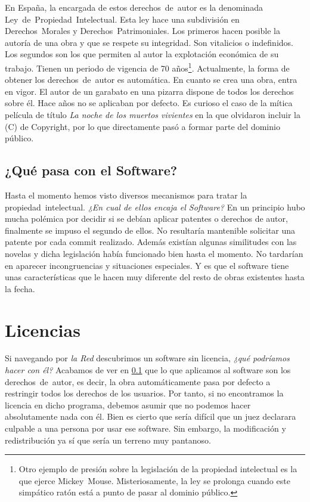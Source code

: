 En España, la encargada de estos derechos~de~autor es la denominada
Ley~de~Propiedad~Intelectual. Esta ley hace una subdivisión en
Derechos~Morales y Derechos~Patrimoniales. Los primeros hacen posible
la autoría de una obra y que se respete su integridad. Son vitalicios
o indefinidos. Los segundos son los que permiten al autor la
explotación económica de su trabajo. Tienen un periodo de vigencia de
70 años\footnote{Otro ejemplo de presión sobre la legislación de la
  propiedad intelectual es la que ejerce
  Mickey~Mouse. Misteriosamente, la ley se prolonga cuando este
  simpático ratón está a punto de pasar al dominio
  público.}. Actualmente, la forma de obtener los derechos~de~autor es
automática. En cuanto se crea una obra, entra en vigor. El autor de un
garabato en una pizarra dispone de todos los derechos sobre él. Hace
años no se aplicaban por defecto. Es curioso el caso de la mítica
película de título \emph{La noche de los muertos vivientes} en la que
olvidaron incluir la (C) de Copyright, por lo que directamente pasó a
formar parte del dominio público.

\subsection{¿Qué pasa con el Software?}
\label{sub:que_pasa}
Hasta el momento hemos visto diversos mecanismos para tratar la
propiedad~intelectual. \emph{¿En cual de ellos encaja el Software?} En
un principio hubo mucha polémica por decidir si se debían aplicar
patentes o derechos de autor, finalmente se impuso el segundo de
ellos. No resultaría mantenible solicitar una patente por cada commit
realizado. Además existían algunas similitudes con las novelas y dicha
legislación había funcionado bien hasta el momento. No tardarían en
aparecer incongruencias y situaciones especiales. Y es que el software
tiene unas características que le hacen muy diferente del resto de
obras existentes hasta la fecha.

\section{Licencias}


Si navegando por \emph{la Red} descubrimos un software sin licencia,
\emph{¿qué podríamos hacer con él?} Acabamos de ver en
\ref{sub:que_pasa} que lo que aplicamos al software son los
derechos~de~autor, es decir, la obra automáticamente pasa por defecto
a restringir todos los derechos de los usuarios. Por tanto, si no
encontramos la licencia en dicho programa, debemos asumir que no
podemos hacer absolutamente nada con él. Bien es cierto que sería
difícil que un juez declarara culpable a una persona por usar ese
software. Sin embargo, la modificación y redistribución ya sí que
sería un terreno muy pantanoso.

